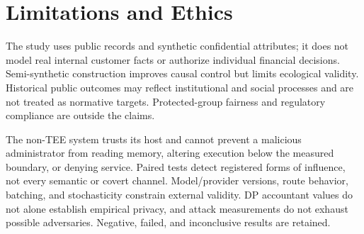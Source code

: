 \section{Limitations and Ethics}

The study uses public records and synthetic confidential attributes; it does
not model real internal customer facts or authorize individual financial
decisions. Semi-synthetic construction improves causal control but limits
ecological validity. Historical public outcomes may reflect institutional and
social processes and are not treated as normative targets. Protected-group
fairness and regulatory compliance are outside the claims.

The non-TEE system trusts its host and cannot prevent a malicious administrator
from reading memory, altering execution below the measured boundary, or denying
service. Paired tests detect registered forms of influence, not every semantic
or covert channel. Model/provider versions, route behavior, batching, and
stochasticity constrain external validity. DP accountant values do not alone
establish empirical privacy, and attack measurements do not exhaust possible
adversaries. Negative, failed, and inconclusive results are retained.
